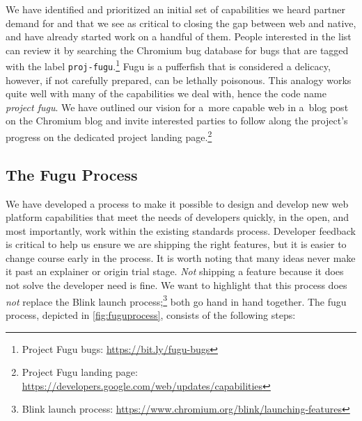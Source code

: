 \documentclass[sigconf, anonymous]{acmart}
\begin{document}
We have identified and prioritized an initial set of capabilities
we heard partner demand for and that we see as critical to closing the gap
between web and native, and have already started work on a handful of them.
People interested in the list can review it by searching the Chromium bug database
for bugs that are tagged with the label
\texttt{proj-fugu}.\footnote{Project Fugu bugs: \url{https://bit.ly/fugu-bugs}}
Fugu is a pufferfish that is considered a delicacy, however,  
if not carefully prepared, can be lethally poisonous. 
This analogy works quite well with many of the capabilities we deal with,
hence the code name \textit{project fugu}.
We have outlined our vision for a~more capable web in a~blog post~\cite{lepage18}
on the Chromium blog and invite interested parties to follow along the project's progress
on the dedicated project landing
page.\footnote{Project Fugu landing page: \url{https://developers.google.com/web/updates/capabilities}}

\subsection{The Fugu Process}

We have developed a process to make it possible to design and develop
new web platform capabilities that meet the needs of developers quickly,
in the open, and most importantly, work within the existing standards process.
Developer feedback is critical to help us ensure we are shipping the right features,
but it is easier to change course early in the process.
It is worth noting that many ideas never make it past an explainer or origin trial stage.
\textit{Not} shipping a feature because it does not solve the developer need is fine.
We want to highlight that this process does \textit{not} replace the Blink launch
process;\footnote{Blink launch process: \url{https://www.chromium.org/blink/launching-features}}
both go hand in hand together.
The fugu process, depicted in \autoref{fig:fuguprocess}, consists of the following steps:
\end{document}
